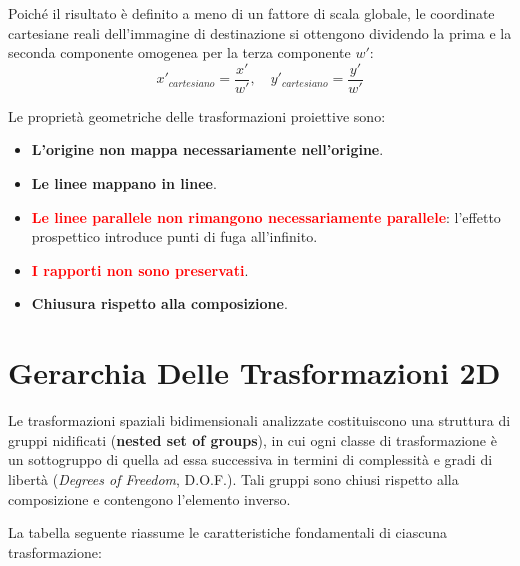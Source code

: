 ﻿\documentclass[11pt, a4paper]{article}
\begin{document}
Poiché il risultato è definito a meno di un fattore di scala globale, le coordinate cartesiane reali dell'immagine di destinazione si ottengono dividendo la prima e la seconda componente omogenea per la terza componente $w'$:
\[
x'_{cartesiano} = \frac{x'}{w'}, \quad y'_{cartesiano} = \frac{y'}{w'}
\]

Le proprietà geometriche delle trasformazioni proiettive sono:
\begin{itemize}[noitemsep]
    \item \textbf{L'origine non mappa necessariamente nell'origine}.
    \item \textbf{Le linee mappano in linee}.
    \item \textbf{\textcolor{red}{Le linee parallele non rimangono necessariamente parallele}}: l'effetto prospettico introduce punti di fuga all'infinito.
    \item \textbf{\textcolor{red}{I rapporti non sono preservati}}.
    \item \textbf{Chiusura rispetto alla composizione}.
\end{itemize}

\newpage

\section{Gerarchia Delle Trasformazioni 2D}

Le trasformazioni spaziali bidimensionali analizzate costituiscono una struttura di gruppi nidificati (\textbf{nested set of groups}), in cui ogni classe di trasformazione è un sottogruppo di quella ad essa successiva in termini di complessità e gradi di libertà (\emph{Degrees of Freedom}, D.O.F.). Tali gruppi sono chiusi rispetto alla composizione e contengono l'elemento inverso.


La tabella seguente riassume le caratteristiche fondamentali di ciascuna trasformazione:
\end{document}
